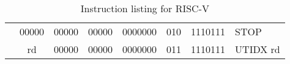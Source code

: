 \begin{table}[p]
\begin{small}
\begin{center}
\begin{tabular}{rccccccccccl}
&
\multicolumn{1}{|c|}{00000} &
\multicolumn{1}{c|}{00000} &
\multicolumn{1}{c|}{00000} &
\multicolumn{4}{c|}{0000000} &
\multicolumn{2}{c|}{010} &
\multicolumn{1}{c|}{1110111} & STOP  \\
\cline{2-11}
  

&
\multicolumn{1}{|c|}{rd} &
\multicolumn{1}{c|}{00000} &
\multicolumn{1}{c|}{00000} &
\multicolumn{4}{c|}{0000000} &
\multicolumn{2}{c|}{011} &
\multicolumn{1}{c|}{1110111} & UTIDX rd \\
\cline{2-11}
  

\end{tabular}
\end{center}
\end{small}
\caption{Instruction listing for RISC-V}
\label{instr-table}
\end{table}
  
